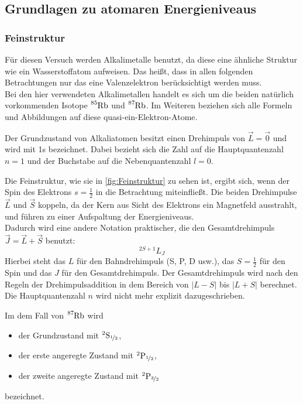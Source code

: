     \subsection{Grundlagen zu atomaren Energieniveaus}
        \subsubsection*{Feinstruktur}
            Für diesen Versuch werden Alkalimetalle benutzt, da diese eine ähnliche Struktur wie ein Wasserstoffatom aufweisen.
            Das heißt, dass in allen folgenden Betrachtungen nur das eine Valenzelektron berücksichtigt werden muss.\\
            Bei den hier verwendeten Alkalimetallen handelt es sich um die beiden natürlich vorkommenden Isotope $\ce{^{85}Rb}$ und $\ce{^{87}Rb}$. Im Weiteren beziehen sich alle Formeln und Abbildungen auf diese quasi-ein-Elektron-Atome.

            Der Grundzustand von Alkaliatomen besitzt einen Drehimpuls von $\vec{L} = \vec{0}$ und wird mit 1s bezeichnet.
            Dabei bezieht sich die Zahl auf die Hauptquantenzahl $n = 1$ und der Buchstabe auf die Nebenquantenzahl $l = 0$.

            Die Feinstruktur, wie sie in \autoref{fig:Feinstruktur} zu sehen ist, ergibt sich, wenn der Spin des Elektrons $s = \frac{1}{2}$ in die Betrachtung miteinfließt.
            Die beiden Drehimpulse $\vec{L}$ und $\vec{S}$ koppeln, da der Kern aus Sicht des Elektrons ein Magnetfeld ausstrahlt, und führen zu einer Aufspaltung der Energieniveaus.\\
            Dadurch wird eine andere Notation praktischer, die den Gesamtdrehimpuls $\vec{J} = \vec{L} + \vec{S}$ benutzt:
            \begin{equation*}
                ^{2S+1}L_J
            \end{equation*}
            Hierbei steht das $L$ für den Bahndrehimpuls (S, P, D usw.), das $S = \frac{1}{2}$ für den Spin und das $J$ für den Gesamtdrehimpuls.
            Der Gesamtdrehimpuls wird nach den Regeln der Drehimpulsaddition in dem Bereich von $|L - S|$ bis $|L + S|$ berechnet.
            Die Hauptquantenzahl $n$ wird nicht mehr explizit dazugeschrieben.

            Im dem Fall von $\ce{^{87}Rb}$ wird
            \begin{itemize}
                \item der Grundzustand mit $^2\text{S}_{\nicefrac{1}{2}}$,
                \item der erste angeregte Zustand mit $^2\text{P}_{\nicefrac{1}{2}}$,
                \item der zweite angeregte Zustand mit $^2\text{P}_{\nicefrac{3}{2}}$
            \end{itemize}
            bezeichnet.


